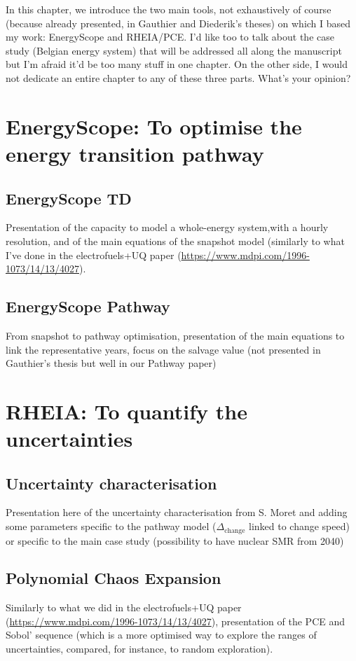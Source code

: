 In this chapter, we introduce the two main tools, not exhaustively of course (because already presented, in Gauthier and Diederik's theses) on which I based my work: EnergyScope and RHEIA/PCE. I'd like too to talk about the case study (Belgian energy system) that will be addressed all along the manuscript but I'm afraid it'd be too many stuff in one chapter. On the other side, I would not dedicate an entire chapter to any of these three parts. What's your opinion?
\section{EnergyScope: To optimise the energy transition pathway}
\label{sec:energyscope}

\subsection{EnergyScope TD}
\label{subsec:estd}
Presentation of the capacity to model a whole-energy system,with a hourly resolution, and of the main equations of the snapshot model (similarly to what I've done in the electrofuels+UQ paper (\url{https://www.mdpi.com/1996-1073/14/13/4027}).

\subsection{EnergyScope Pathway}
\label{subsec:espathway}
From snapshot to pathway optimisation, presentation of the main equations to link the representative years, focus on the salvage value (not presented in Gauthier's thesis but well in our Pathway paper)

\section{RHEIA: To quantify the uncertainties}
\label{sec:rheia}


\subsection{Uncertainty characterisation}
\label{subsec:uncert_charac}
Presentation here of the uncertainty characterisation from S. Moret and adding some parameters specific to the pathway model (\eg $\Delta_{\text{change}}$ linked to change speed) or specific to the main case study (\eg possibility to have nuclear SMR from 2040)


\subsection{Polynomial Chaos Expansion}
\label{subsec:pce}
Similarly to what we did in the electrofuels+UQ paper (\url{https://www.mdpi.com/1996-1073/14/13/4027}), presentation of the PCE and Sobol' sequence (which is a more optimised way to explore the ranges of uncertainties, compared, for instance, to random exploration).


